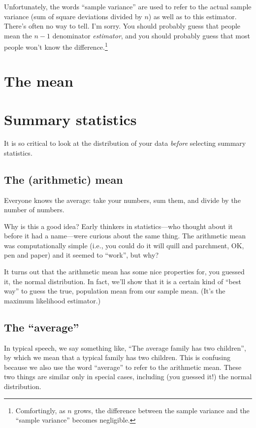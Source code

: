 Unfortunately, the words ``sample variance'' are used to refer to the
actual sample variance (sum of square deviations divided by \(n\)) as
well as to this estimator. There's often no way to tell. I'm sorry. You
should probably guess that people mean the \(n-1\) denominator
\emph{estimator}, and you should probably guess that most people won't
know the difference.\footnote{Comfortingly, as \(n\) grows, the
  difference between the sample variance and the ``sample variance''
  becomes negligible.}

\section{The mean}


\section{Summary statistics}\label{summary-statistics}

It is so critical to look
at the distribution of your data \emph{before} selecting summary
statistics.

\subsection{The (arithmetic) mean}\label{the-arithmetic-mean}

Everyone knows the average: take your numbers, sum them, and divide by
the number of numbers.

Why is this a good idea? Early thinkers in statistics---who thought
about it before it had a name---were curious about the same thing. The
arithmetic mean was computationally simple (i.e., you could do it will
quill and parchment, OK, pen and paper) and it seemed to ``work'', but
why?

It turns out that the arithmetic mean has some nice properties for, you
guessed it, the normal distribution. In fact, we'll show that it is a
certain kind of ``best way'' to guess the true, population mean from our
sample mean. (It's the maximum likelihood estimator.)

\subsection{The ``average''}

In typical speech, we say something like, ``The average family has two
children'', by which we mean that a typical family has two children.
This is confusing because we also use the word ``average'' to refer to
the arithmetic mean. These two things are similar only in special cases,
including (you guessed it!) the normal distribution.

